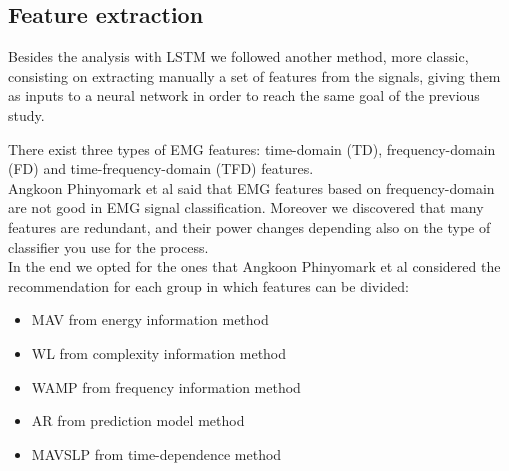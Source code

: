 \documentclass[journal]{IEEEtran}
\begin{document}
\subsection{Feature extraction}
Besides the analysis with LSTM we followed another method, more classic, consisting on extracting manually a set of features from the signals, giving them as inputs to a neural network in order to reach the same goal of the previous study.


There exist three types of EMG features: time-domain (TD), frequency-domain (FD) and time-frequency-domain (TFD) features. \\ 
Angkoon Phinyomark et al said that EMG features based on frequency-domain are not good in EMG signal classification. Moreover we discovered that many features are redundant, and their power changes depending also on the type of classifier you use for the process.
\\
In the end we opted for the ones that Angkoon Phinyomark et al considered the recommendation for each group in which features can be divided:
\begin{itemize}
	\item MAV from energy information method
	\item WL from complexity information method
	\item WAMP from frequency information method
	\item AR from prediction model method
	\item MAVSLP from time-dependence method
\end{itemize}
\end{document}
